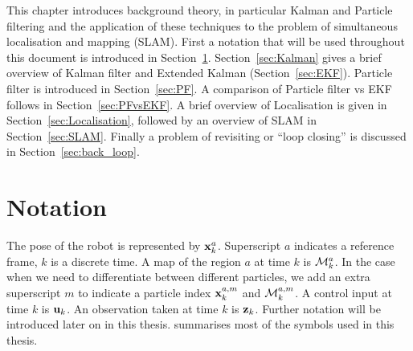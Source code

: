 This chapter introduces background theory, in particular Kalman and
Particle filtering and the application of these techniques to the
problem of simultaneous localisation and mapping (SLAM). First a
notation that will be used throughout this document is introduced in
Section~\ref{sec:Notation}. Section~\ref{sec:Kalman} gives a brief
overview of Kalman filter and Extended Kalman (Section~\ref{sec:EKF}).
Particle filter is introduced in Section~\ref{sec:PF}. A comparison of
Particle filter vs EKF follows in Section~\ref{sec:PFvsEKF}. A brief
overview of Localisation is given in Section~\ref{sec:Localisation},
followed by an overview of SLAM in Section~\ref{sec:SLAM}. Finally a
problem of revisiting or ``loop closing'' is discussed in
Section~\ref{sec:back_loop}.


\section {Notation}
\label{sec:Notation}

The pose of the robot is represented by $\x{k}{}{a}$. Superscript $a$
indicates a reference frame, $k$ is a discrete time. A map of the
region $a$ at time $k$ is $\map{k}{}{a}$. In the case when we need to
differentiate between different particles, we add an extra superscript
$m$ to indicate a particle index $\x{k}{a}{m}$ and $\map{k}{a}{m}$. A
control input at time $k$ is ${\bf u}_{k}$. An observation taken at time $k$
is ${\bf z}_{k}$. Further notation will be introduced later on in this
thesis.  summarises most of the symbols used in
this thesis.




